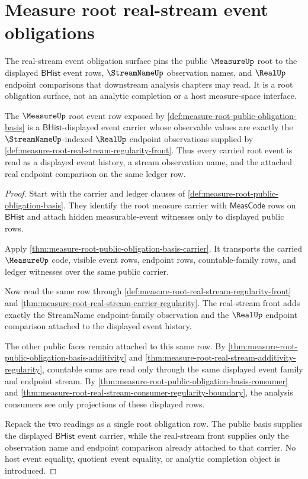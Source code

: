 \section{Measure root real-stream event obligations}
\label{sec:measure-root-real-stream-event-obligations}

The real-stream event obligation surface pins the public $\MeasureUp$ root to
the displayed $\mathsf{BHist}$ event rows, $\StreamNameUp$ observation names,
and $\RealUp$ endpoint comparisons that downstream analysis chapters may read.
It is a root obligation surface, not an analytic completion or a host
measure-space interface.

\begin{theorem}
\label{thm:measure-root-real-stream-event-obligation}
The $\MeasureUp$ root event row exposed by
\autoref{def:measure-root-public-obligation-basis} is a
$\mathsf{BHist}$-displayed event carrier whose observable values are exactly
the $\StreamNameUp$-indexed $\RealUp$ endpoint observations supplied by
\autoref{def:measure-root-real-stream-regularity-front}. Thus every carried
root event is read as a displayed event history, a stream observation name,
and the attached real endpoint comparison on the same ledger row.
\end{theorem}
\begin{proof}
Start with the carrier and ledger clauses of
\autoref{def:measure-root-public-obligation-basis}. They identify the root
measure carrier with $\mathsf{MeasCode}$ rows on $\mathsf{BHist}$ and attach
hidden measurable-event witnesses only to displayed public rows.

Apply \autoref{thm:measure-root-public-obligation-basis-carrier}. It
transports the carried $\MeasureUp$ code, visible event rows, endpoint rows,
countable-family rows, and ledger witnesses over the same public carrier.

Now read the same row through
\autoref{def:measure-root-real-stream-regularity-front} and
\autoref{thm:measure-root-real-stream-carrier-regularity}. The real-stream
front adds exactly the StreamName endpoint-family observation and the
$\RealUp$ endpoint comparison attached to the displayed event history.

The other public faces remain attached to this same row. By
\autoref{thm:measure-root-public-obligation-basis-additivity} and
\autoref{thm:measure-root-real-stream-additivity-regularity}, countable sums
are read only through the same displayed event family and endpoint stream.
By \autoref{thm:measure-root-public-obligation-basis-consumer} and
\autoref{thm:measure-root-real-stream-consumer-regularity-boundary}, the
analysis consumers see only projections of these displayed rows.

Repack the two readings as a single root obligation row. The public basis
supplies the displayed $\mathsf{BHist}$ event carrier, while the real-stream
front supplies only the observation name and endpoint comparison already
attached to that carrier. No host event equality, quotient event equality, or
analytic completion object is introduced.
\end{proof}

